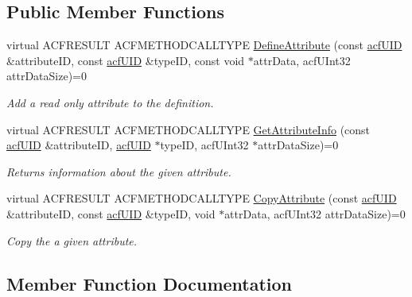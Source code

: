 \subsection*{Public Member Functions}
\begin{DoxyCompactItemize}
\item 
virtual A\+C\+F\+R\+E\+S\+U\+L\+T A\+C\+F\+M\+E\+T\+H\+O\+D\+C\+A\+L\+L\+T\+Y\+P\+E \hyperlink{a00145_abf9f28b14b95f0835857a9096d108989}{Define\+Attribute} (const \hyperlink{a00150_ab19414382287ff80930c48a196145214}{acf\+U\+I\+D} \&attribute\+I\+D, const \hyperlink{a00150_ab19414382287ff80930c48a196145214}{acf\+U\+I\+D} \&type\+I\+D, const void $\ast$attr\+Data, acf\+U\+Int32 attr\+Data\+Size)=0
\begin{DoxyCompactList}\small\item\em Add a read only attribute to the definition. \end{DoxyCompactList}\item 
virtual A\+C\+F\+R\+E\+S\+U\+L\+T A\+C\+F\+M\+E\+T\+H\+O\+D\+C\+A\+L\+L\+T\+Y\+P\+E \hyperlink{a00145_a067fc04f95d5b558634f8df3bc266815}{Get\+Attribute\+Info} (const \hyperlink{a00150_ab19414382287ff80930c48a196145214}{acf\+U\+I\+D} \&attribute\+I\+D, \hyperlink{a00150_ab19414382287ff80930c48a196145214}{acf\+U\+I\+D} $\ast$type\+I\+D, acf\+U\+Int32 $\ast$attr\+Data\+Size)=0
\begin{DoxyCompactList}\small\item\em Returns information about the given attribute. \end{DoxyCompactList}\item 
virtual A\+C\+F\+R\+E\+S\+U\+L\+T A\+C\+F\+M\+E\+T\+H\+O\+D\+C\+A\+L\+L\+T\+Y\+P\+E \hyperlink{a00145_a8dd0017a8c9bfd837d8938e09995c6bb}{Copy\+Attribute} (const \hyperlink{a00150_ab19414382287ff80930c48a196145214}{acf\+U\+I\+D} \&attribute\+I\+D, const \hyperlink{a00150_ab19414382287ff80930c48a196145214}{acf\+U\+I\+D} \&type\+I\+D, void $\ast$attr\+Data, acf\+U\+Int32 attr\+Data\+Size)=0
\begin{DoxyCompactList}\small\item\em Copy the a given attribute. \end{DoxyCompactList}\end{DoxyCompactItemize}


\subsection{Member Function Documentation}
\hypertarget{a00145_abf9f28b14b95f0835857a9096d108989}{}
